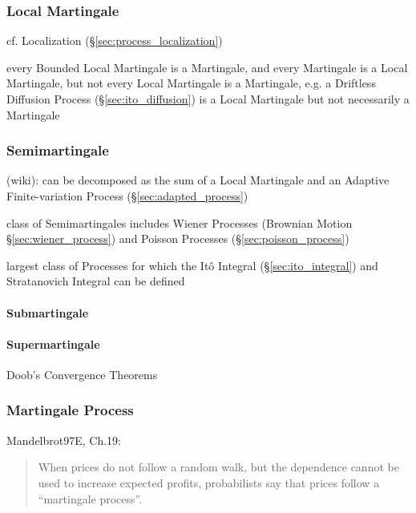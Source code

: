 \subsubsection{Local Martingale}\label{sec:local_martingale}

cf. Localization (\S\ref{sec:process_localization})

every Bounded Local Martingale is a Martingale, and every Martingale is a Local
Martingale, but not every Local Martingale is a Martingale, e.g. a Driftless
Diffusion Process (\S\ref{sec:ito_diffusion}) is a Local Martingale but not
necessarily a Martingale



\subsubsection{Semimartingale}\label{sec:semimartingale}

(wiki): can be decomposed as the sum of a Local Martingale and an Adaptive
Finite-variation Process (\S\ref{sec:adapted_process})

class of Semimartingales includes Wiener Processes (Brownian Motion
\S\ref{sec:wiener_process}) and Poisson Processes
(\S\ref{sec:poisson_process})

largest class of Processes for which the It\^o Integral
(\S\ref{sec:ito_integral}) and Stratanovich Integral can be defined



\paragraph{Submartingale}\label{sec:submartingale}\hfill

\paragraph{Supermartingale}\label{sec:supermartingale}\hfill

Doob's Convergence Theorems



\subsubsection{Martingale Process}\label{sec:martingale_process}


Mandelbrot97E, Ch.19:

\begin{quote}
  When prices do not follow a random walk, but the dependence cannot be used to
  increase expected profits, probabilists say that prices follow a ``martingale
  process''.
\end{quote}

